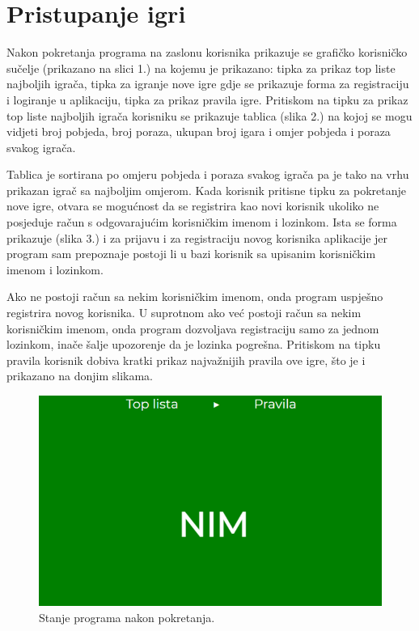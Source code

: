 
\section{Pristupanje igri}

Nakon pokretanja programa na zaslonu korisnika prikazuje se grafičko korisničko sučelje (prikazano na slici 1.) na kojemu je prikazano: tipka za prikaz top liste najboljih igrača, tipka za igranje nove igre gdje se prikazuje forma za registraciju i logiranje u aplikaciju, tipka za prikaz pravila igre. Pritiskom na tipku za prikaz top liste najboljih igrača korisniku se prikazuje tablica (slika 2.) na kojoj se mogu vidjeti broj pobjeda, broj poraza, ukupan broj igara i omjer pobjeda i poraza svakog igrača.\newline

Tablica je sortirana po omjeru pobjeda i poraza svakog igrača pa je tako na vrhu prikazan igrač sa najboljim omjerom. Kada korisnik pritisne tipku za pokretanje nove igre, otvara se mogućnost da se registrira kao novi korisnik ukoliko ne posjeduje račun s odgovarajućim korisničkim imenom i lozinkom. Ista se forma prikazuje (slika 3.) i za prijavu i za registraciju novog korisnika aplikacije jer program sam prepoznaje postoji li u bazi korisnik sa upisanim korisničkim imenom i lozinkom.\newline 

Ako ne postoji račun sa nekim korisničkim imenom, onda program uspješno registrira novog korisnika. U suprotnom ako već postoji račun sa nekim korisničkim imenom, onda program dozvoljava registraciju samo za jednom lozinkom, inače šalje upozorenje da je lozinka pogrešna. Pritiskom na tipku pravila korisnik dobiva kratki prikaz najvažnijih pravila ove igre, što je i prikazano na donjim slikama.


\begin{figure}[H]
\centering
\includegraphics[width=14cm]{slike-program/Slika1.png}
\caption{Stanje programa nakon pokretanja.}
\label{}
\end{figure}

